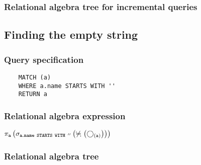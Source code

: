 	\subsubsection*{Relational algebra tree for incremental queries}

	\subsection{Finding the empty string}

	\subsubsection*{Query specification}

	\begin{lstlisting}
	MATCH (a)
	WHERE a.name STARTS WITH ''
	RETURN a
	\end{lstlisting}


	\subsubsection*{Relational algebra expression}

	$\projection{\var{a}} \left(\selection{\mathtt{a.name~STARTS~WITH~''}} \left(\alldifferent{} \left(\getvertices{a}{}\right)\right)\right)$

	\subsubsection*{Relational algebra tree}


